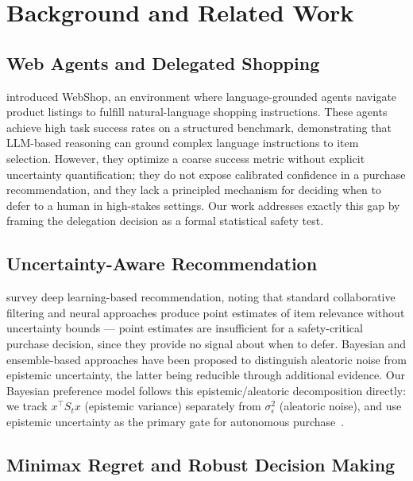 \documentclass[11pt,letterpaper]{article}
\begin{document}
\section{Background and Related Work}
\label{sec:background}

\subsection{Web Agents and Delegated Shopping}

\citet{yao2022webshop} introduced WebShop, an environment where language-grounded agents navigate product listings to fulfill natural-language shopping instructions.  These agents achieve high task success rates on a structured benchmark, demonstrating that LLM-based reasoning can ground complex language instructions to item selection.  However, they optimize a coarse success metric without explicit uncertainty quantification; they do not expose calibrated confidence in a purchase recommendation, and they lack a principled mechanism for deciding when to defer to a human in high-stakes settings.  Our work addresses exactly this gap by framing the delegation decision as a formal statistical safety test.

\subsection{Uncertainty-Aware Recommendation}

\citet{bdecf2025} survey deep learning-based recommendation, noting that standard collaborative filtering and neural approaches produce point estimates of item relevance without uncertainty bounds --- point estimates are insufficient for a safety-critical purchase decision, since they provide no signal about when to defer.  Bayesian and ensemble-based approaches have been proposed to distinguish aleatoric noise from epistemic uncertainty, the latter being reducible through additional evidence.  Our Bayesian preference model follows this epistemic/aleatoric decomposition directly: we track $x^\top S_t x$ (epistemic variance) separately from $\sigma_\epsilon^2$ (aleatoric noise), and use epistemic uncertainty as the primary gate for autonomous purchase~\citep{bishop2006pattern}.

\subsection{Minimax Regret and Robust Decision Making}
\end{document}
